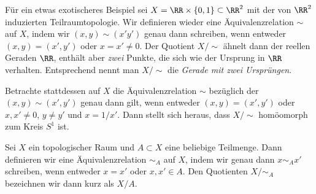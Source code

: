 Für ein etwas exotischeres Beispiel sei $X = \RR\times\{0,1\}\subset \RR^2$ mit
der von $\RR^2$ induzierten Teilraumtopologie. Wir definieren wieder eine Äquivalenzrelation
$\sim$ auf $X$, indem wir $(x,y)\sim (x'y')$ genau dann schreiben, wenn entweder
$(x,y) = (x',y')$ oder $x = x'\neq 0$. Der Quotient $X/{\sim}$ ähnelt dann der
reellen Geraden $\RR$, enthält aber \emph{zwei} Punkte, die sich wie der
Ursprung in $\RR$ verhalten. Entsprechend nennt man $X/{\sim}$ die \emph{Gerade
mit zwei Ursprüngen}.

Betrachte stattdessen auf $X$ die Äquivalenzrelation $\sim$ bezüglich der $(x,y)\sim (x',y')$ genau dann gilt, wenn entweder $(x,y) = (x',y')$ oder $x, x' \neq 0$, $y\neq y'$ und $x = 1/x'$. Dann stellt sich heraus, dass $X/{\sim}$ homöomorph zum Kreis $S^1$ ist.

\begin{definition}
Sei $X$ ein topologischer Raum und $A\subset X$ eine beliebige Teilmenge. Dann
definieren wir eine Äquivalenzrelation $\sim_A$ auf $X$, indem wir genau dann
$x\sim_A x'$ schreiben, wenn entweder $x=x'$ oder $x,x'\in A$. Den Quotienten
$X/{\sim_A}$ bezeichnen wir dann kurz als $X/A$.
\end{definition}


